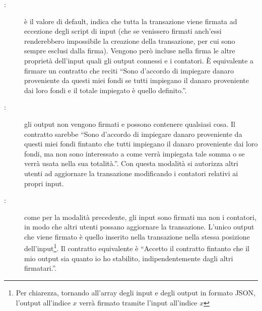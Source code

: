 \begin{description}
    \item[:] è il valore di default, indica che tutta la transazione viene firmata ad eccezione degli script di input (che se venissero firmati anch'essi renderebbero impossibile la creazione della transazione, per cui sono sempre esclusi dalla firma). Vengono però incluse nella firma le altre proprietà dell'input quali gli output connessi e i contatori. È equivalente a firmare un contratto che reciti ``Sono d'accordo di impiegare danaro proveniente da questi miei fondi se tutti impiegano il danaro proveniente dai loro fondi e il totale impiegato è quello definito.''.
    \item[:] gli output non vengono firmati e possono contenere qualsiasi cosa. Il contratto sarebbe ``Sono d'accordo di impiegare danaro proveniente da questi miei fondi fintanto che tutti impiegano il danaro proveniente dai loro fondi, ma non sono interessato a come verrà impiegata tale somma o se verrà usata nella sua totalità.''. Con questa modalità si autorizza altri utenti ad aggiornare la transazione modificando i contatori relativi ai propri input.
    \item[:] come per la modalità precedente, gli input sono firmati ma non i contatori, in modo che altri utenti possano aggiornare la transazione. L'unico output che viene firmato è quello inserito nella transazione nella stessa posizione dell'input\footnote{Per chiarezza, tornando all'array degli input e degli output in formato JSON, l'output all'indice $x$ verrà firmato tramite l'input  all'indice $x$}. Il contratto equivalente è ``Accetto il contratto fintanto che il mio output sia quanto io ho stabilito, indipendentemente dagli altri firmatari.''.
\end{description}

